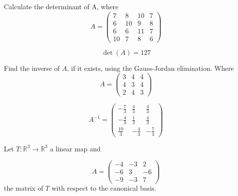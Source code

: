 \begin{questions}

\question Calculate the determinant of A, where
$$
A=\left(\begin{array}{rrrr}
7 & 8 & 10 & 7 \\
6 & 10 & 9 & 8 \\
6 & 6 & 11 & 7 \\
10 & 7 & 8 & 6
\end{array}\right)
$$

\begin{solution}
$$\det(A)=127$$
\end{solution}

\question Find the inverse of $A$, if it exists, using the Gauss-Jordan elimination. Where
$$
A=\left(\begin{array}{rrr}
3 & 4 & 4 \\
4 & 3 & 4 \\
2 & 4 & 3
\end{array}\right)
$$

\begin{solution}
$$A^{-1}=\left(\begin{array}{rrr}
-\frac{7}{3} & \frac{4}{3} & \frac{4}{3} \\
-\frac{4}{3} & \frac{1}{3} & \frac{4}{3} \\
\frac{10}{3} & -\frac{4}{3} & -\frac{7}{3}
\end{array}\right)$$
\end{solution}

\question Let $T:\mathbb{R}^3\rightarrow\mathbb{R}^3$  a linear map and
 
$$
A=\left(\begin{array}{rrr}
-4 & -3 & 2 \\
-6 & 3 & -6 \\
-9 & -3 & 7
\end{array}\right)
$$
the matrix of $T$ with respect to the canonical basis.
\end{questions}
